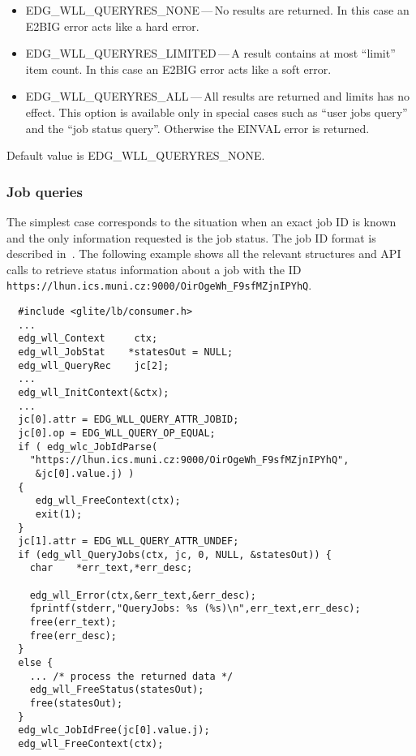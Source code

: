 \begin{itemize}
	\item{EDG\_WLL\_QUERYRES\_NONE}\,---\,No results are returned.
	In this case an E2BIG error acts like a hard error.
	\item{EDG\_WLL\_QUERYRES\_LIMITED}\,---\,A result contains at most ``limit'' item count.
	In this case an E2BIG error acts like a soft error.
	\item{EDG\_WLL\_QUERYRES\_ALL}\,---\,All results are returned and limits has no effect.
	This option is available only in special cases such as ``user jobs query'' and 
	the ``job status query''. Otherwise the EINVAL error is returned.
\end{itemize}
Default value is EDG\_WLL\_QUERYRES\_NONE.


\subsubsection{Job queries}

\label{JS}

The simplest case corresponds to the situation when an exact job ID
is known and the only information requested is the job status. The job ID
format is described in~\cite{djra1.4}.
The following example shows 
all the relevant structures and API calls to retrieve status information
about a job with the ID\\
\texttt{https://lhun.ics.muni.cz:9000/OirOgeWh\_F9sfMZjnIPYhQ}.

\begin{verbatim}
  #include <glite/lb/consumer.h>
  ...
  edg_wll_Context     ctx;    
  edg_wll_JobStat    *statesOut = NULL;
  edg_wll_QueryRec    jc[2];
  ...
  edg_wll_InitContext(&ctx);
  ...
  jc[0].attr = EDG_WLL_QUERY_ATTR_JOBID;
  jc[0].op = EDG_WLL_QUERY_OP_EQUAL;
  if ( edg_wlc_JobIdParse(
    "https://lhun.ics.muni.cz:9000/OirOgeWh_F9sfMZjnIPYhQ",
     &jc[0].value.j) )
  {
     edg_wll_FreeContext(ctx);
     exit(1);
  }
  jc[1].attr = EDG_WLL_QUERY_ATTR_UNDEF;
  if (edg_wll_QueryJobs(ctx, jc, 0, NULL, &statesOut)) {
    char    *err_text,*err_desc;

    edg_wll_Error(ctx,&err_text,&err_desc);
    fprintf(stderr,"QueryJobs: %s (%s)\n",err_text,err_desc);
    free(err_text);
    free(err_desc);
  }
  else {
    ...	/* process the returned data */
    edg_wll_FreeStatus(statesOut);
    free(statesOut);
  }
  edg_wlc_JobIdFree(jc[0].value.j);
  edg_wll_FreeContext(ctx);
\end{verbatim}

